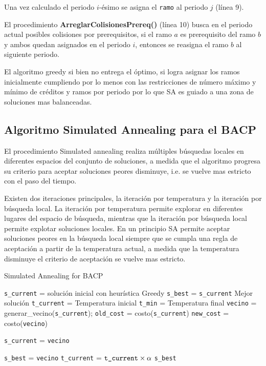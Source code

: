 \documentclass[letterpaper,10pt]{article}
\begin{document}
Una vez calculado el periodo $i$-ésimo se asigna el \texttt{ramo} al periodo $j$ (línea 9).

El procedimiento \textbf{ArreglarColisionesPrereq()} (línea 10) busca en el periodo actual posibles colisiones por prerequisitos, si el ramo $a$ es prerequisito del ramo $b$ y ambos quedan asignados en el periodo $i$, entonces se reasigna el ramo $b$ al siguiente periodo.

El algoritmo greedy si bien no entrega el óptimo, si logra asignar los ramos inicialmente cumpliendo por lo menos con las restricciones de número máximo y mínimo de créditos y ramos por periodo por lo que SA es guiado a una zona de soluciones mas balanceadas.

\subsection{Algoritmo Simulated Annealing para el BACP}

El procedimiento Simulated annealing realiza múltiples búsquedas locales en diferentes espacios del conjunto de soluciones, a medida que el algoritmo progresa su criterio para aceptar soluciones peores disminuye, i.e. se vuelve mas estricto con el paso del tiempo.

Existen dos iteraciones principales, la iteración por temperatura y la iteración por búsqueda local. La iteración por temperatura permite explorar en diferentes lugares del espacio de búsqueda, mientras que la iteración por búsqueda local permite explotar soluciones locales. En un principio SA permite aceptar soluciones peores en la búsqueda local siempre que se cumpla una regla de aceptación a partir de la temperatura actual, a medida que la temperatura disminuye el criterio de aceptación se vuelve mas estricto.

\begin{algorithm}[H]
\caption{Simulated Annealing for BACP}
\label{SimulatedAnnealingAlgo}
\begin{algorithmic}[1]
 {}
     \State \texttt{s\_current} = solución inicial con heurística Greedy
     \State \texttt{s\_best} = \texttt{s\_current} Mejor solución
     \State \texttt{t\_current} = Temperatura inicial
     \State \texttt{t\_min} = Temperatura final
          \State \texttt{vecino} = generar\_vecino(\texttt{s\_current});
          \State \texttt{old\_cost} = costo(\texttt{s\_current})
          \State \texttt{new\_cost} = costo(\texttt{vecino})

            \State \texttt{s\_current} = \texttt{vecino}
          \EndIf

            \State \texttt{s\_best} = \texttt{vecino}
          \EndIf
        \EndFor
        \State \texttt{t\_current} = $\text{\texttt{t\_current}}\times \alpha$
     \EndWhile
     \State \Return \texttt{s\_best}
\EndProcedure
\end{algorithmic}
\end{algorithm}
\end{document}
